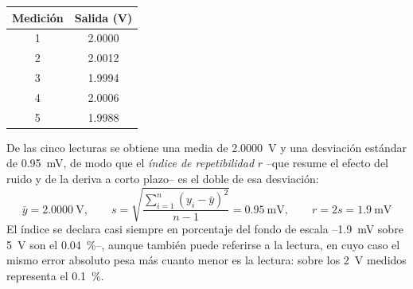 \begin{margintable}
    \centering
    \caption[Cinco lecturas de la misma presión para evaluar la repetibilidad.]{Cinco lecturas consecutivas de la misma presión, con el sensor trabajando sobre un fondo de escala de \SI{0}{\volt} a \SI{5}{\volt}. \protect\label{tab:repetibilidad}}
    \begin{tabular}{c c}
        \toprule
        Medición & Salida (V) \\
        \midrule
        1 & 2.0000 \\
        2 & 2.0012 \\
        3 & 1.9994 \\
        4 & 2.0006 \\
        5 & 1.9988 \\
        \bottomrule
    \end{tabular}
\end{margintable}

De las cinco lecturas se obtiene una media de \SI{2.0000}{\volt} y una desviación estándar de \SI{0.95}{\milli\volt}, de modo que el \emph{índice de repetibilidad} $r$ --que resume el efecto del ruido y de la deriva a corto plazo-- es el doble de esa desviación:
\begin{equation}\label{eq:repetibilidad}
    \bar{y} = \SI{2.0000}{\volt}, \qquad s = \sqrt{\frac{\sum_{i=1}^{n}{(y_i - \bar{y})}^2}{n-1}} = \SI{0.95}{\milli\volt}, \qquad r = 2s = \SI{1.9}{\milli\volt}
\end{equation}
El índice se declara casi siempre en porcentaje del fondo de escala --\SI{1.9}{\milli\volt} sobre \SI{5}{\volt} son el \SI{0.04}{\percent}--, aunque también puede referirse a la lectura, en cuyo caso el mismo error absoluto pesa más cuanto menor es la lectura: sobre los \SI{2}{\volt} medidos representa el \SI{0.1}{\percent}.

